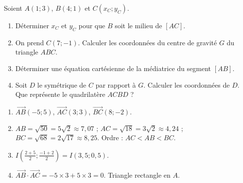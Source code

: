 \documentclass[11pt]{article}
\begin{document}
\begin{exercice}
    Soient $A(1;3)$, $B(4;1)$ et $C(x_C;y_C)$.
    \begin{enumerate}
        \item Déterminer $x_C$ et $y_C$ pour que $B$ soit le milieu de $[AC]$.
        \item On prend $C(7;-1)$. Calculer les coordonnées du centre de gravité $G$ du triangle $ABC$.
        \item Déterminer une équation cartésienne de la médiatrice du segment $[AB]$.
        \item Soit $D$ le symétrique de $C$ par rapport à $G$. Calculer les coordonnées de $D$. Que représente le quadrilatère $ACBD$ ?
    \end{enumerate}
\end{exercice}

\begin{corrige}
    \begin{enumerate}
        \item $\overrightarrow{AB}(-5;5)$, $\overrightarrow{AC}(3;3)$, $\overrightarrow{BC}(8;-2)$.
        \item $AB=\sqrt{50}=5\sqrt{2}\approx 7,07$ ; $AC=\sqrt{18}=3\sqrt{2}\approx 4,24$ ; $BC=\sqrt{68}=2\sqrt{17}\approx 8,25$. Ordre : $AC < AB < BC$.
        \item $I\left(\frac{2+5}{2};\frac{-1+2}{2}\right) = I(3,5;0,5)$.
        \item $\overrightarrow{AB}\cdot\overrightarrow{AC} = -5\times3 + 5\times3 = 0$. Triangle rectangle en $A$.
    \end{enumerate}
\end{corrige}
\end{document}
